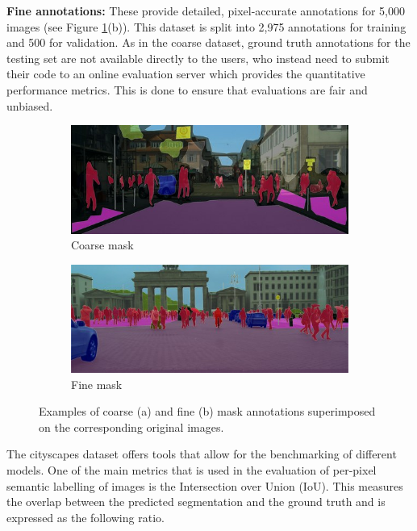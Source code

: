 \textbf{Fine annotations:} These provide detailed, pixel-accurate annotations for 5,000 images (see Figure \ref{fig:cityscapes}(b)). This dataset is split into 2,975 annotations for training and 500 for validation. As in the coarse dataset, ground truth annotations for the testing set are not available directly to the users, who instead need to submit their code to an online evaluation server which provides the quantitative performance metrics. This is done to ensure that evaluations are fair and unbiased.

\begin{figure}[ht]
	\begin{subfigure}{.5\textwidth}
		\includegraphics[width=\textwidth]{coarse_example.jpg}
		\caption{Coarse mask}
	\end{subfigure}
	\begin{subfigure}{.5\textwidth}
		\includegraphics[width=\textwidth]{fine_example.jpg}
		\caption{Fine mask}
	\end{subfigure}
	\caption{Examples of coarse (a) and fine (b) mask annotations superimposed on the corresponding original images.}
	\label{fig:cityscapes}
\end{figure}

The cityscapes dataset offers tools that allow for the benchmarking of different models. One of the main metrics that is used in the evaluation of per-pixel semantic labelling of images is the Intersection over Union (IoU). This measures the overlap between the predicted segmentation and the ground truth and is expressed as the following ratio.

